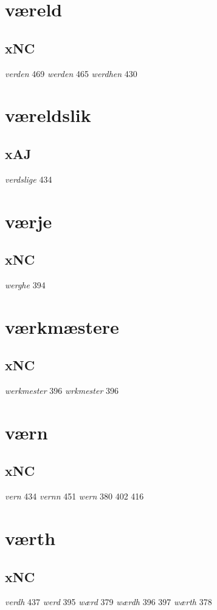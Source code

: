 \documentclass[a4paper,twocolumn]{article}
\begin{document}
\section{væreld}
\label{sec:org070706d}
\subsection{xNC}
\label{sec:org0702bb8}
\emph{verden} 469 \emph{werden} 465 \emph{werdhen} 430 
\section{væreldslik}
\label{sec:org2e236e1}
\subsection{xAJ}
\label{sec:org26f6499}
\emph{verdslige} 434 
\section{værje}
\label{sec:org0feca11}
\subsection{xNC}
\label{sec:orga5e7873}
\emph{werghe} 394 
\section{værkmæstere}
\label{sec:orgf4cbd25}
\subsection{xNC}
\label{sec:orgca10a4a}
\emph{werkmester} 396 \emph{wrkmester} 396 
\section{værn}
\label{sec:org0eeb930}
\subsection{xNC}
\label{sec:org7207cb7}
\emph{vern} 434 \emph{vernn} 451 \emph{wern} 380 402 416 
\section{værth}
\label{sec:orgd9aff1d}
\subsection{xNC}
\label{sec:org3963c9c}
\emph{verdh} 437 \emph{werd} 395 \emph{wærd} 379 \emph{wærdh} 396 397 \emph{wærth} 378 
\end{document}
